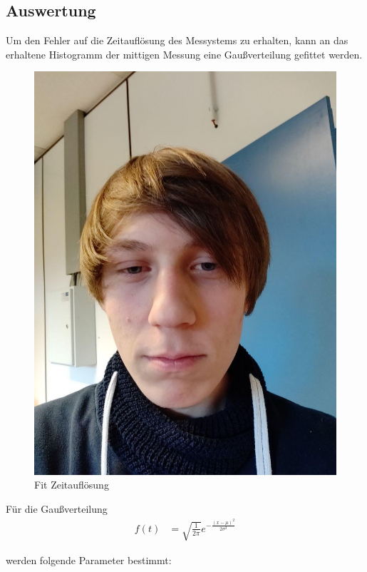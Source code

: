 \documentclass[12pt,twoside,a4paper]{scrartcl}
\begin{document}
			\subsection{Auswertung}
				Um den Fehler auf die Zeitauflösung des Messystems zu erhalten, kann an das erhaltene Histogramm der mittigen Messung eine Gaußverteilung gefittet werden.

				\begin{figure}[H]
					\centering

						\includegraphics[width=\textwidth]{Pictures/Platzhalter.jpg}

					\caption{Fit Zeitauflösung}
				\end{figure}

				Für die Gaußverteilung
				\begin{align*}
					f(t) &= \sqrt{\frac{1}{2 \pi}} e^{-\frac{(x-\mu)^2}{2 \sigma^2}}
				\end{align*}

				werden folgende Parameter bestimmt:
\end{document}
